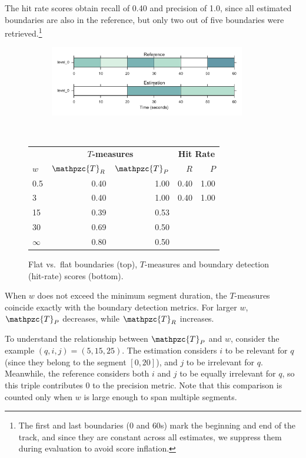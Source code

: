 \documentclass{article}
\def\shag{\ensuremath{\mathpzc{T}}}
\begin{document}
The hit rate scores obtain recall of 0.40 and precision of 1.0, since all estimated boundaries are also in the reference, but only two out of five boundaries were retrieved.\footnote{The first and last boundaries ($0$ and $60$s) mark the beginning and end of the track, and since they 
are constant across all estimates, we suppress them during evaluation to avoid score inflation.}
\begin{figure}
  \centering
  \begin{subfigure}{0.5\textwidth}
    \centering
    \includegraphics[width=0.94\textwidth]{figs/flat-flat.pdf}
  \end{subfigure}%
  \\
  \begin{minipage}{0.5\textwidth}
    \small
    \centering
    \vspace{10pt}
    \begin{tabular}{l|rr|rr}
      & \multicolumn{2}{c|}{\textbf{$T$-measures}} & \multicolumn{2}{c}{\textbf{Hit Rate}} \\
      $w$ & $\shag_R$   & $\shag_P$ &  $R$     & $P$ \\
      \hline
      0.5       & 0.40   & 1.00   & 0.40 & 1.00 \\
      3         & 0.40   & 1.00   & 0.40 & 1.00 \\
      15        & 0.39  & 0.53 \\
      30        & 0.69  & 0.50 \\
      $\infty$  & 0.80   & 0.50 
    \end{tabular}
  \end{minipage}
  \caption{Flat vs.\ flat boundaries (top), $T$-measures and boundary detection
    (hit-rate) scores (bottom).}
  \label{fig:flat-flat}
\end{figure}
When $w$ does not exceed the minimum segment duration, the $T$-measures coincide
exactly with the boundary detection metrics.
For larger $w$, $\shag_P$ decreases, while $\shag_R$ increases.

To understand the relationship between $\shag_P$ and $w$, consider the example 
$(q,i,j) = (5,15,25)$.
The estimation considers $i$ to be relevant for $q$ (since they belong to the segment $[0, 20]$), 
and $j$ to be irrelevant for $q$. Meanwhile, the reference considers both $i$
and $j$ to be equally irrelevant for $q$, so this triple contributes 0 to the precision
metric.
Note that this comparison is counted only when $w$ is large enough to span multiple
segments.
\end{document}

